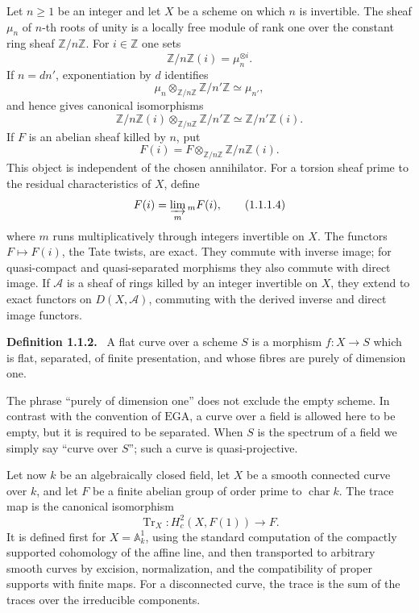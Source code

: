 \documentclass[12pt]{article}
\newcommand{\Aa}{\mathcal A}
\newcommand{\Zz}{\mathbb Z}
\newenvironment{statement}[1]{\par\medskip\noindent\textbf{#1.}\ }{\par\medskip}
\begin{document}
Let \(n\geq1\) be an integer and let \(X\) be a scheme on which \(n\) is invertible. The sheaf \(\mu_n\) of \(n\)-th roots of unity is a locally free module of rank one over the constant ring sheaf \(\Zz/n\Zz\). For \(i\in\Zz\) one sets
\[
\Zz/n\Zz(i)=\mu_n^{\otimes i}. \tag{1.1.1.1}
\]
If \(n=dn'\), exponentiation by \(d\) identifies
\[
\mu_n\otimes_{\Zz/n\Zz}\Zz/n'\Zz\simeq \mu_{n'},
\]
and hence gives canonical isomorphisms
\[
\Zz/n\Zz(i)\otimes_{\Zz/n\Zz}\Zz/n'\Zz\simeq \Zz/n'\Zz(i). \tag{1.1.1.2}
\]
If \(F\) is an abelian sheaf killed by \(n\), put
\[
F(i)=F\otimes_{\Zz/n\Zz}\Zz/n\Zz(i). \tag{1.1.1.3}
\]
This object is independent of the chosen annihilator. For a torsion sheaf prime to the residual characteristics of \(X\), define
\[
F(i)=\varinjlim_m {}_mF(i), \tag{1.1.1.4}
\]
where \(m\) runs multiplicatively through integers invertible on \(X\). The functors \(F\mapsto F(i)\), the Tate twists, are exact. They commute with inverse image; for quasi-compact and quasi-separated morphisms they also commute with direct image. If \(\Aa\) is a sheaf of rings killed by an integer invertible on \(X\), they extend to exact functors on \(D(X,\Aa)\), commuting with the derived inverse and direct image functors.

\begin{statement}{Definition 1.1.2}
A flat curve over a scheme \(S\) is a morphism \(f:X\to S\) which is flat, separated, of finite presentation, and whose fibres are purely of dimension one.
\end{statement}

The phrase ``purely of dimension one'' does not exclude the empty scheme. In contrast with the convention of \(\mathrm{EGA}\), a curve over a field is allowed here to be empty, but it is required to be separated. When \(S\) is the spectrum of a field we simply say ``curve over \(S\)''; such a curve is quasi-projective.

Let now \(k\) be an algebraically closed field, let \(X\) be a smooth connected curve over \(k\), and let \(F\) be a finite abelian group of order prime to \(\operatorname{char}k\). The trace map is the canonical isomorphism
\[
\operatorname{Tr}_X:H^2_c(X,F(1))\longrightarrow F.
\]
It is defined first for \(X=\mathbb A^1_k\), using the standard computation of the compactly supported cohomology of the affine line, and then transported to arbitrary smooth curves by excision, normalization, and the compatibility of proper supports with finite maps. For a disconnected curve, the trace is the sum of the traces over the irreducible components.
\end{document}
